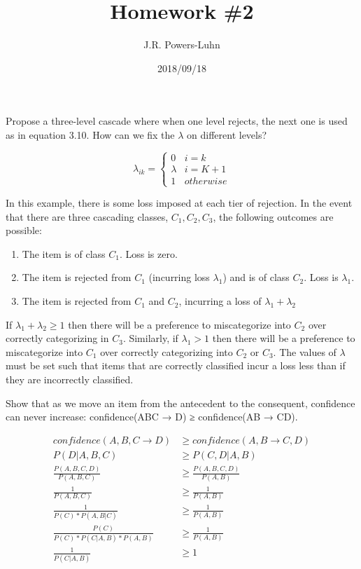 \documentclass{hw}
\author{J.R. Powers-Luhn}
\date{2018/09/18}
\title{Homework \#2}
\begin{document}

    Propose a three-level cascade where when one level rejects, the next one is used as in equation 3.10. How can we fix the $\lambda$ on different levels? 

    \begin{equation}
        \lambda_{ik} =
        \begin{cases}
        0 & i = k \\
        \lambda & i = K + 1 \\
        1 & otherwise

    \end{cases}
    \end{equation}

\solution
    In this example, there is some loss imposed at each tier of rejection. In the event that there are three cascading classes, $C_1, C_2, C_3$, the following outcomes are possible:
    
    \begin{enumerate}
        \item The item is of class $C_1$. Loss is zero.
        \item The item is rejected from $C_1$ (incurring loss $\lambda_1$) and is of class $C_2$. Loss is $\lambda_1$.
        \item The item is rejected from $C_1$ and $C_2$, incurring a loss of $\lambda_1 + \lambda_2$
    \end{enumerate}

    If $\lambda_1 + \lambda_2 \geq 1$ then there will be a preference to miscategorize into $C_2$ over correctly categorizing in $C_3$. Similarly, if $\lambda_1 > 1$ then there will be a preference to miscategorize into $C_1$ over correctly categorizing into $C_2$ or $C_3$. The values of $\lambda$ must be set such that items that are correctly classified incur a loss less than if they are incorrectly classified.

    Show that as we move an item from the antecedent to the consequent, confidence can never increase: confidence(ABC → D) ≥ confidence(AB → CD).

\solution
    \begin{align*}
        confidence(A,B,C \rightarrow D) &\geq confidence(A,B \rightarrow C,D) \\
        P(D | A, B, C) &\geq P(C, D | A, B) \\
        \frac{P(A, B, C, D)}{P(A, B, C)} &\geq \frac{P(A, B, C, D)}{P(A, B)} \\
        \frac{1}{P(A, B, C)} &\geq \frac{1}{P(A, B)} \\
        \frac{1}{P(C)*P(A,B|C)} &\geq \frac{1}{P(A, B)} \\
        \frac{P(C)}{P(C)*P(C | A, B)*P(A, B)} &\geq \frac{1}{P(A, B)} \\
        \frac{1}{P(C | A, B)} &\geq 1
    \end{align*}
\end{document}
